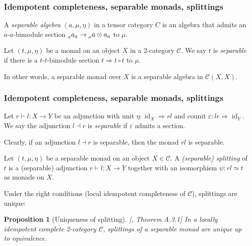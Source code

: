 \documentclass{beamer}
\newcommand{\tnsr}{\otimes}
\newcommand{\veps}{{\varepsilon}}
\DeclareMathOperator{\id}{id}
\newtheorem{proposition}[theorem]{Proposition}
\newcommand{\cC}{{\mathcal{C}}}
\begin{document}
\begin{frame}
\frametitle{Idempotent completeness, separable monads, splittings}

\begin{definition}
A \emph{separable algebra} $(a,\mu,\eta)$ in a tensor category $C$
is an algebra that admits an $a$-$a$-bimodule section
$\prescript{}{a}a_a \to \prescript{}{a}a \tnsr a_a$
to $\mu$.
\end{definition}

\pause

\begin{definition}
Let $(t, \mu, \eta)$ be a monad on an object $X$
in a 2-category $\cC$.
We say $t$ is \emph{separable} if there is a
$t$-$t$-bimodule section
$t \Rightarrow t \circ t$ to $\mu$.
\end{definition}

\pause

In other words, a separable monad over $X$
is a separable algebra in $\cC(X,X)$.

\end{frame}

\begin{frame}
\frametitle{Idempotent completeness, separable monads, splittings}

\begin{definition}
Let $r \vdash l: X \to Y$ be an adjunction
with unit $\eta: \id_X \Rightarrow rl$
and counit $\veps: lr \Rightarrow \id_Y$.
We say the adjunction $l \dashv r$ is \emph{separable}
if $\veps$ admits a section.
\end{definition}

\pause

Clearly, if an adjunction $l \dashv r$ is separable,
then the monad $rl$ is separable.

\pause

\begin{definition}
Let $(t,\mu,\eta)$ be a separable monad on
an object $X \in \cC$.
A \emph{(separable) splitting} of $t$ is a (separable) adjunction
$r \vdash l: X \to Y$
together with an isomorphism
$\psi: rl \simeq t$ as monads on $X$.
\end{definition}

\pause

Under the right conditions
(local idempotent completeness of $\cC$),
splittings are unique:

\begin{proposition}[Uniqueness of splitting]
[\cite{DRfusion}, Theorem A.3.1]
\label{p:splitting-unique}
In a locally idempotent complete 2-category $\cC$,
splittings of a separable monad are unique
up to equivalence.
\end{proposition}


\end{frame}
\end{document}
